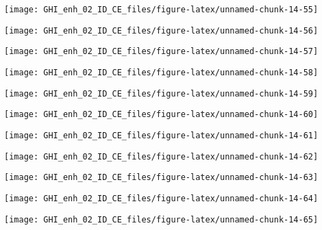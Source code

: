 \documentclass[
  10pt,
  a4paper,oneside]{article}
\begin{document}
\begin{center}\texttt{[image: GHI\_enh\_02\_ID\_CE\_files/figure-latex/unnamed-chunk-14-55]} \end{center}

\begin{center}\texttt{[image: GHI\_enh\_02\_ID\_CE\_files/figure-latex/unnamed-chunk-14-56]} \end{center}

\begin{center}\texttt{[image: GHI\_enh\_02\_ID\_CE\_files/figure-latex/unnamed-chunk-14-57]} \end{center}

\begin{center}\texttt{[image: GHI\_enh\_02\_ID\_CE\_files/figure-latex/unnamed-chunk-14-58]} \end{center}

\begin{center}\texttt{[image: GHI\_enh\_02\_ID\_CE\_files/figure-latex/unnamed-chunk-14-59]} \end{center}

\begin{center}\texttt{[image: GHI\_enh\_02\_ID\_CE\_files/figure-latex/unnamed-chunk-14-60]} \end{center}

\begin{center}\texttt{[image: GHI\_enh\_02\_ID\_CE\_files/figure-latex/unnamed-chunk-14-61]} \end{center}

\begin{center}\texttt{[image: GHI\_enh\_02\_ID\_CE\_files/figure-latex/unnamed-chunk-14-62]} \end{center}

\begin{center}\texttt{[image: GHI\_enh\_02\_ID\_CE\_files/figure-latex/unnamed-chunk-14-63]} \end{center}

\begin{center}\texttt{[image: GHI\_enh\_02\_ID\_CE\_files/figure-latex/unnamed-chunk-14-64]} \end{center}

\begin{center}\texttt{[image: GHI\_enh\_02\_ID\_CE\_files/figure-latex/unnamed-chunk-14-65]} \end{center}
\end{document}
